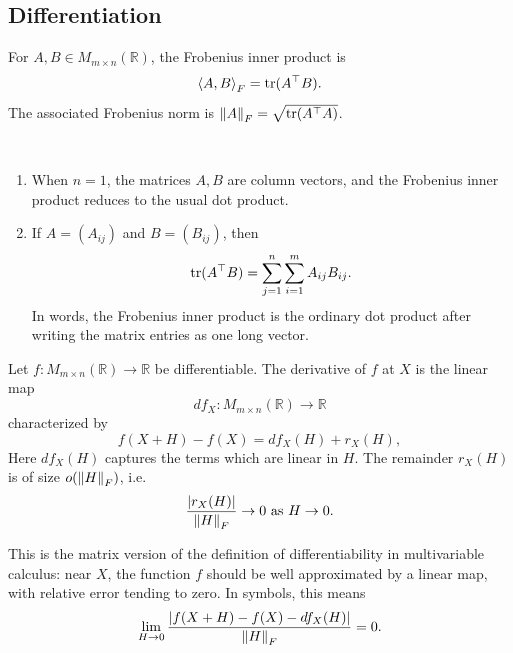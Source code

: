 
\subsection{Differentiation}
\begin{definition}
For $A,B\in M_{m\times n}(\mathbb{R})$, the Frobenius inner product is
\[
    \left\langle A, B \right\rangle_F
    =
    \operatorname{tr}(A^{\top} B).
\]
The associated Frobenius norm is
$\left\lVert A \right\rVert_F=\sqrt{\operatorname{tr}(A^{\top} A)}$.
\end{definition}

\begin{remark}\ \vspace{-2em}
\begin{enumerate}
    \item When $n=1$, the matrices $A,B$ are column vectors, and the Frobenius inner product reduces to the usual dot product.
    \item If $A=(A_{ij})$ and $B=(B_{ij})$, then
    \[
        \operatorname{tr}(A^{\top} B)
        =
        \sum_{j=1}^n\sum_{i=1}^m A_{ij}B_{ij}.
    \]
    In words, the Frobenius inner product is the ordinary dot product after writing the matrix entries as one long vector.
\end{enumerate}
\end{remark}


\begin{definition}[Derivative]
Let $f:M_{m\times n}(\mathbb{R})\to\mathbb{R}$ be differentiable. The derivative of $f$ at $X$ is the linear map
\[
    df_X:M_{m\times n}(\mathbb{R})\to\mathbb{R}
\]
characterized by
\[
    f(X+H)-f(X)=df_X(H)+r_X(H),
\]
Here $df_X(H)$ captures the terms which are linear in $H$.
The remainder $r_X(H)$ is of size $o(\left\lVert H \right\rVert_F)$, i.e.
\[
    \frac{|r_X(H)|}{\left\lVert H \right\rVert_F}\to 0
    \text{ as }H\to 0.
\]
\end{definition}

\begin{remark}
This is the matrix version of the definition of differentiability in multivariable calculus: near $X$, the function $f$ should be well approximated by a linear map, with relative error tending to zero.
In symbols, this means
\[
    \lim_{H\to 0}
    \frac{|f(X+H)-f(X)-df_X(H)|}{\left\lVert H \right\rVert_F}
    =0.
\]
\end{remark}

